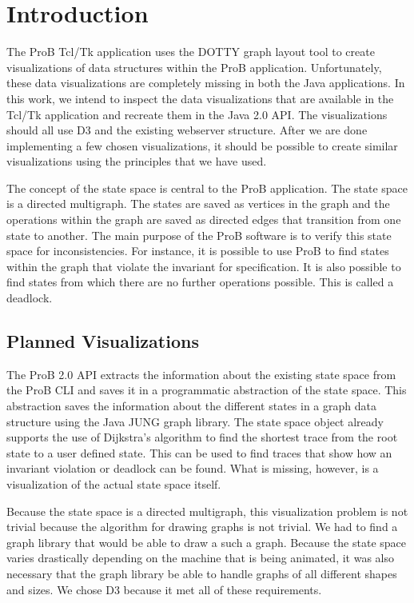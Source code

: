 \section{Introduction}

The ProB Tcl/Tk application uses the DOTTY graph layout tool to create visualizations of data structures within the ProB application. Unfortunately, these data visualizations are completely missing in both the Java applications. In this work, we intend to inspect the data visualizations that are available in the Tcl/Tk application and recreate them in the Java 2.0 API. The visualizations should all use D3 and the existing webserver structure. After we are done implementing a few chosen visualizations, it should be possible to create similar visualizations using the principles that we have used. 

The concept of the state space is central to the ProB application. The state space is a directed multigraph. The states are saved as vertices in the graph and the operations within the graph are saved as directed edges that transition from one state to another. The main purpose of the ProB software is to verify this state space for inconsistencies. For instance, it is possible to use ProB to find states within the graph that violate the invariant for specification. It is also possible to find states from which there are no further operations possible. This is called a deadlock.

\subsection{Planned Visualizations}

The ProB 2.0 API extracts the information about the existing state space from the ProB CLI and saves it in a programmatic abstraction of the state space. This abstraction saves the information about the different states in a graph data structure using the Java JUNG graph library. The state space object already supports the use of Dijkstra's algorithm to find the shortest trace from the root state to a user defined state. This can be used to find traces that show how an invariant violation or deadlock can be found. What is missing, however, is a visualization of the actual state space itself.

Because the state space is a directed multigraph, this visualization problem is not trivial because the algorithm for drawing graphs is not trivial. We had to find a graph library that would be able to draw a such a graph. Because the state space varies drastically depending on the machine that is being animated, it was also necessary that the graph library be able to handle graphs of all different shapes and sizes. We chose D3 because it met all of these requirements.

